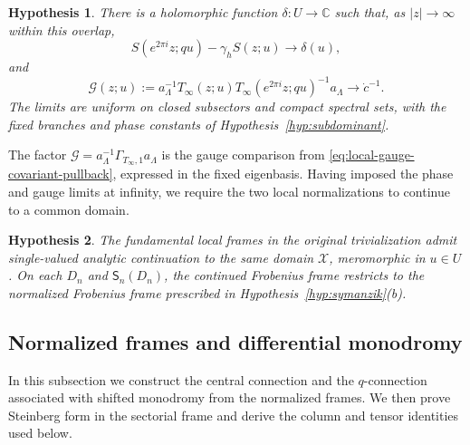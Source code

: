 \documentclass[11pt,leqno]{amsart}
\numberwithin{equation}{section}
\theoremstyle{plain}
\theoremstyle{definition}
\theoremstyle{plain}
\newtheorem{hypothesis}{Hypothesis}
\theoremstyle{definition}
\theoremstyle{remark}
\begin{document}
\begin{hypothesis}\label{hyp:common-orbit}
There is a holomorphic function $\delta:U\to\mathbb C$ such that, as $|z|\to\infty$ within this overlap,
\begin{equation}\label{eq:analytic-phase-rotation}
 S(e^{2\pi i}z;qu)-\gamma_hS(z;u)\longrightarrow\delta(u),
\end{equation}
and
\begin{equation}\label{eq:analytic-gauge-rotation}
 \mathcal G(z;u):=a_\Lambda^{-1}T_\infty(z;u)
 T_\infty(e^{2\pi i}z;qu)^{-1}a_\Lambda
 \longrightarrow\dot c^{-1}.
\end{equation}
The limits are uniform on closed subsectors and compact spectral sets, with the fixed branches and phase constants of Hypothesis~\ref{hyp:subdominant}.
\end{hypothesis}

The factor $\mathcal G=a_\Lambda^{-1}\Gamma_{T_\infty,1}a_\Lambda$ is the gauge comparison from \eqref{eq:local-gauge-covariant-pullback}, expressed in the fixed eigenbasis.  Having imposed the phase and gauge limits at infinity, we require the two local normalizations to continue to a common domain.
\begin{hypothesis}\label{hyp:ccm}
The fundamental local frames in the original trivialization admit single-valued analytic continuation to the same domain $\mathscr X$, meromorphic in $u\in U$. On each $D_n$ and $\mathsf S_n(D_n)$, the continued Frobenius frame restricts to the normalized Frobenius frame prescribed in Hypothesis~\ref{hyp:symanzik}(b).
\end{hypothesis}

\subsection{Normalized frames and differential monodromy}\label{sec:general-analytic-consequences}
In this subsection we construct the central connection and the $q$-connection associated with shifted monodromy from the normalized frames.  We then prove Steinberg form in the sectorial frame and derive the column and tensor identities used below.
\end{document}
